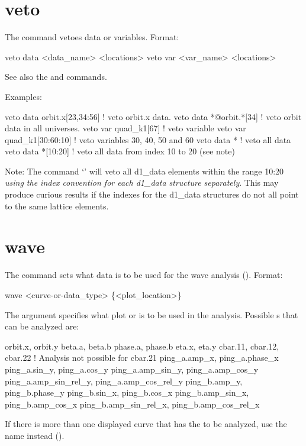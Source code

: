 {{{{{{{{{%

\section{veto}
\label{s:veto}

The  command vetoes data or variables. Format:
\begin{example}
  veto data <data_name> <locations>
  veto var <var_name> <locations>
\end{example}

\vskip 7pt 

See also the  and  commands.

Examples:
\begin{example}
  veto data orbit.x[23,34:56]  ! veto orbit.x data.
  veto data *@orbit.*[34]      ! veto orbit data in all universes.
  veto var quad_k1[67]         ! veto variable
  veto var quad_k1[30:60:10]   ! veto variables 30, 40, 50 and 60
  veto data *                  ! veto all data
  veto data *[10:20]           ! veto all data from index 10 to 20 (see note)
\end{example}

Note: The command `' will veto all d1\_data elements within the
range 10:20 \textit{using the index convention for each d1\_data structure
separately}. This may produce curious results if the indexes for the d1\_data structures
do not all point to the same lattice elements.


\section{wave}
\label{s:wave}

The  command sets what data is to be used for the wave analysis (). 
Format:
\begin{example}
  wave <curve-or-data_type> \{<plot_location>\}
\end{example}

\vskip 7pt

The  argument specifies what plot  or  is to be
used in the analysis. Possible s that can be analyzed are:
\begin{example}
  orbit.x, orbit.y
  beta.a,  beta.b
  phase.a, phase.b
  eta.x, eta.y
  cbar.11, cbar.12, cbar.22      ! Analysis not possible for cbar.21
  ping_a.amp_x, ping_a.phase_x
  ping_a.sin_y, ping_a.cos_y
  ping_a.amp_sin_y, ping_a.amp_cos_y
  ping_a.amp_sin_rel_y, ping_a.amp_cos_rel_y
  ping_b.amp_y, ping_b.phase_y
  ping_b.sin_x, ping_b.cos_x
  ping_b.amp_sin_x, ping_b.amp_cos_x
  ping_b.amp_sin_rel_x, ping_b.amp_cos_rel_x
\end{example}
If there is more than one displayed curve that has the  to be analyzed, use the
 name instead ().

}}}}}}}}}
